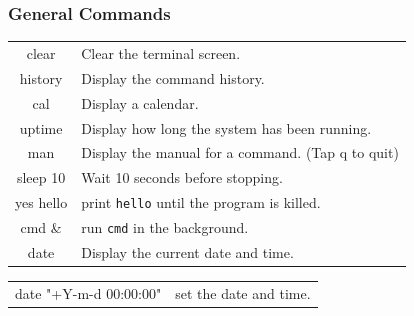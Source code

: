 \documentclass[10pt]{article}
\begin{document}
\begin{multicols}{2}
\subsubsection{General Commands}
\begin{tabular}{C L}
    clear     & Clear the terminal screen. \\
    history   & Display the command history. \\
    cal       & Display a calendar. \\
    uptime    & Display how long the system has been running. \\
    man       & Display the manual for a command. (Tap q to quit)\\
    sleep 10  & Wait 10 seconds before stopping.\\
    yes hello & print \texttt{hello} until the program is killed.\\
    cmd \&    & run \texttt{cmd} in the background.\\
    date      & Display the current date and time. \\
\end{tabular}
\begin{tabular}{C L}
date "+Y-m-d 00:00:00" & set the date and time. \\
\end{tabular}



\end{multicols}
\end{document}

